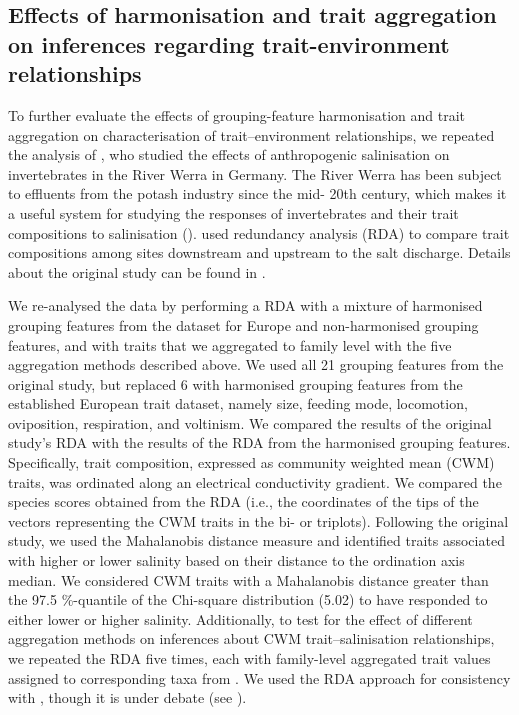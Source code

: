 \documentclass[12pt]{article}
\begin{document}

\subsection*{Effects of harmonisation and trait aggregation on inferences regarding trait-environment relationships}

To further evaluate the effects of grouping-feature harmonisation and trait aggregation on characterisation of trait–environment relationships, we repeated the analysis of \citet{szocs_effects_2014}, who studied the effects of anthropogenic salinisation on invertebrates in the River Werra in Germany. The River Werra has been subject to effluents from the potash industry since the mid- 20th century, which makes it a useful system for studying the responses of invertebrates and their trait compositions to salinisation (\cite{bathe_biological_2011}). \citet{szocs_effects_2014} used redundancy analysis (RDA) to compare trait compositions among sites downstream and upstream to the salt discharge. Details about the original study can be found in \citet{szocs_effects_2014}.

We re-analysed the \citet{szocs_effects_2014} data by performing a RDA with a mixture of harmonised grouping features from the dataset for Europe and non-harmonised grouping features, and with traits that we aggregated to family level with the five aggregation methods described above. We used all 21 grouping features from the original study, but replaced 6 with harmonised grouping features from the established European trait dataset, namely size, feeding mode, locomotion, oviposition, respiration, and voltinism.
We compared the results of the original study’s RDA with the results of the RDA from the harmonised grouping features. Specifically, trait composition, expressed as community weighted mean (CWM) traits, was ordinated along an electrical conductivity gradient. We compared the species scores obtained from the RDA (i.e., the coordinates of the tips of the vectors representing the CWM traits in the bi- or triplots). Following the original study, we used the Mahalanobis distance measure and identified traits associated with higher or lower salinity based on their distance to the ordination axis median. We considered CWM traits with a Mahalanobis distance greater than the 97.5 \%-quantile of the Chi-square distribution (5.02) to have responded to either lower or higher salinity. Additionally, to test for the effect of different aggregation methods on inferences about CWM trait–salinisation relationships, we repeated the RDA five times, each with family-level aggregated trait values assigned to corresponding taxa from \citet{szocs_effects_2014}. We used the RDA approach for consistency with \citet{szocs_effects_2014}, though it is under debate (see \citet{peres-netoLinkingTraitVariation2017, millerFunctionalTraitsCommunity2019}).
\end{document}
